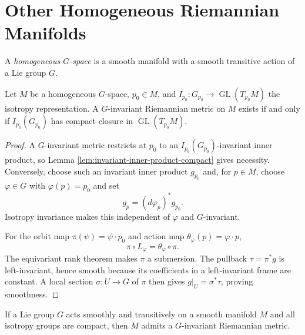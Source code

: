 \section{Other Homogeneous Riemannian Manifolds}

A \emph{homogeneous $G$-space} is a smooth manifold with a smooth transitive
action of a Lie group $G$.

\begin{theorem}
\label{thm:existence-invariant-metrics-homogeneous-spaces}
Let $M$ be a homogeneous $G$-space, $p_0\in M$, and
$I_{p_0}\colon G_{p_0}\to\operatorname{GL}(T_{p_0}M)$ the isotropy
representation. A $G$-invariant Riemannian metric on $M$ exists if and only if
$I_{p_0}(G_{p_0})$ has compact closure in
$\operatorname{GL}(T_{p_0}M)$.
\end{theorem}
\begin{proof}
\sketch A $G$-invariant metric restricts at $p_0$ to an
$I_{p_0}(G_{p_0})$-invariant inner product, so Lemma
\ref{lem:invariant-inner-product-compact} gives necessity. Conversely, choose
such an invariant inner product $g_{p_0}$ and, for $p\in M$, choose
$\varphi\in G$ with $\varphi(p)=p_0$ and set
\[
g_p=(d\varphi_p)^*g_{p_0}.
\]
Isotropy invariance makes this independent of $\varphi$ and $G$-invariant.

For the orbit map $\pi(\psi)=\psi\cdot p_0$ and action map
$\theta_\varphi(p)=\varphi\cdot p$,
\begin{equation}
\pi\circ L_\varphi=\theta_\varphi\circ\pi. \tag{3.17}
\end{equation}
The equivariant rank theorem makes $\pi$ a submersion. The pullback
$\tau=\pi^*g$ is left-invariant, hence smooth because its coefficients in a
left-invariant frame are constant. A local section $\sigma\colon U\to G$ of
$\pi$ then gives $g|_U=\sigma^*\tau$, proving smoothness.
\end{proof}

\begin{corollary}
\label{cor:invariant-metric-compact-isotropy}
If a Lie group $G$ acts smoothly and transitively on a smooth manifold $M$ and
all isotropy groups are compact, then $M$ admits a $G$-invariant Riemannian
metric.
\end{corollary}

